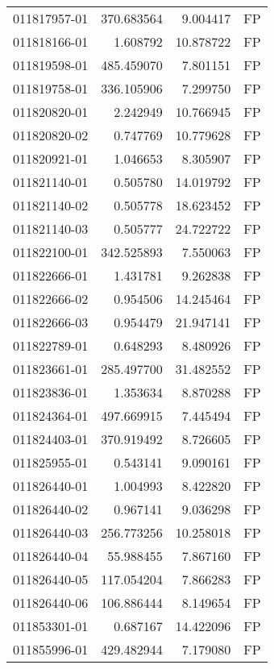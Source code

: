 \begin{tabular}{lrrl}
011817957-01 &  370.683564 &       9.004417 &   FP \\
011818166-01 &    1.608792 &      10.878722 &   FP \\
011819598-01 &  485.459070 &       7.801151 &   FP \\
011819758-01 &  336.105906 &       7.299750 &   FP \\
011820820-01 &    2.242949 &      10.766945 &   FP \\
011820820-02 &    0.747769 &      10.779628 &   FP \\
011820921-01 &    1.046653 &       8.305907 &   FP \\
011821140-01 &    0.505780 &      14.019792 &   FP \\
011821140-02 &    0.505778 &      18.623452 &   FP \\
011821140-03 &    0.505777 &      24.722722 &   FP \\
011822100-01 &  342.525893 &       7.550063 &   FP \\
011822666-01 &    1.431781 &       9.262838 &   FP \\
011822666-02 &    0.954506 &      14.245464 &   FP \\
011822666-03 &    0.954479 &      21.947141 &   FP \\
011822789-01 &    0.648293 &       8.480926 &   FP \\
011823661-01 &  285.497700 &      31.482552 &   FP \\
011823836-01 &    1.353634 &       8.870288 &   FP \\
011824364-01 &  497.669915 &       7.445494 &   FP \\
011824403-01 &  370.919492 &       8.726605 &   FP \\
011825955-01 &    0.543141 &       9.090161 &   FP \\
011826440-01 &    1.004993 &       8.422820 &   FP \\
011826440-02 &    0.967141 &       9.036298 &   FP \\
011826440-03 &  256.773256 &      10.258018 &   FP \\
011826440-04 &   55.988455 &       7.867160 &   FP \\
011826440-05 &  117.054204 &       7.866283 &   FP \\
011826440-06 &  106.886444 &       8.149654 &   FP \\
011853301-01 &    0.687167 &      14.422096 &   FP \\
011855996-01 &  429.482944 &       7.179080 &   FP \\

\end{tabular}
